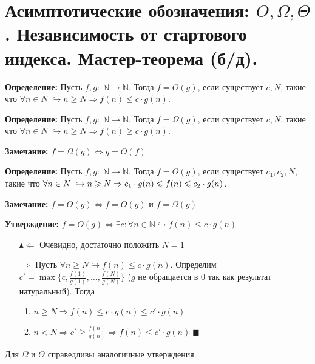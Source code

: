 \section{Асимптотические обозначения: $O, \Omega, \Theta$. Независимость от стартового индекса. Мастер-теорема (б/д).}
\par \textbf{Определение:} Пусть $f,g: \; \mathbb{N} \rightarrow \mathbb{N}$. Тогда $f=O(g)$, если существует $c, N$, такие что $\forall n \in N \; \hookrightarrow n \geqslant N \Rightarrow f(n) \leqslant c \cdot g(n)$.
\par \textbf{Определение:} Пусть $f,g: \; \mathbb{N} \rightarrow \mathbb{N}$. Тогда $f=\Omega(g)$, если существует $c, N$, такие что $\forall n \in N \; \hookrightarrow n \geqslant N \Rightarrow f(n) \geqslant c \cdot g(n)$.
\par \textbf{Замечание:} $f = \Omega(g) \Leftrightarrow g = O(f)$
\par \textbf{Определение:} Пусть $f,g: \; \mathbb{N} \rightarrow \mathbb{N}$. Тогда $f=\Theta(g)$, если существует $c_1,c_2, N$, такие что $\forall n \in N \; \hookrightarrow \\ n \geqslant N \Rightarrow c_1 \cdot g(n) \leqslant f(n) \leqslant c_2 \cdot g(n)$.
\par \textbf{Замечание:} $f = \Theta(g) \Leftrightarrow f = O(g)$ и $f = \Omega(g)$
\par \textbf{Утверждение:} $f = O(g) \Leftrightarrow \exists c: \forall n \in \mathbb{N} \hookrightarrow f(n) \leqslant c \cdot g(n)$ 
\par \begin{itemize}
    \item[$\blacktriangle \Leftarrow$] Очевидно, достаточно положить $N=1$
    \item[$\Rightarrow$] Пусть $\forall n \geqslant N \hookrightarrow f(n) \leqslant c \cdot g(n)$. Определим $c'=\max \{c, \frac{f(1)}{g(1)}, \ldots, \frac{f(N)}{g(N)}\}$ ($g$ не обращается в 0 так как результат натуральный). Тогда \begin{enumerate}
        \item $n \geqslant N \Rightarrow f(n) \leqslant c \cdot g(n) \leqslant c' \cdot g(n)$
        \item $n < N \Rightarrow c' \geqslant \frac{f(n)}{g(n)} \Rightarrow f(n) \leqslant c' \cdot g(n) \; \blacksquare$
    \end{enumerate}
\end{itemize}
\par Для $\Omega$ и $\Theta$ справедливы аналогичные утверждения.
